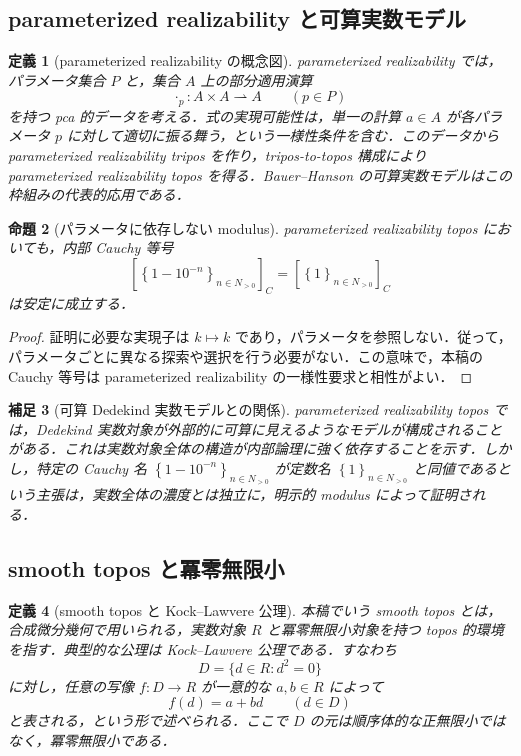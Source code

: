 \documentclass[a4paper,11pt]{ltjsarticle}
\theoremstyle{jpdef}
\newtheorem{definition}{定義}[section]
\newtheorem{remark}[definition]{補足}
\theoremstyle{jpthm}
\newtheorem{proposition}[definition]{命題}
\newcommand{\seq}[2]{\left\{#1\right\}_{#2}}
\begin{document}
\subsection{parameterized realizability と可算実数モデル}

\begin{definition}[parameterized realizability の概念図]
parameterized realizability では，パラメータ集合 \(P\) と，集合 \(A\) 上の部分適用演算
\[
  \cdot_p:A\times A\rightharpoonup A\qquad(p\in P)
\]
を持つ pca 的データを考える．式の実現可能性は，単一の計算 \(a\in A\) が各パラメータ \(p\) に対して適切に振る舞う，という一様性条件を含む．このデータから parameterized realizability tripos を作り，tripos-to-topos 構成により parameterized realizability topos を得る．Bauer--Hanson の可算実数モデルはこの枠組みの代表的応用である．
\end{definition}

\begin{proposition}[パラメータに依存しない modulus]
parameterized realizability topos においても，内部 Cauchy 等号
\[
  [\seq{1-10^{-n}}{n\in N_{>0}}]_C=[\seq{1}{n\in N_{>0}}]_C
\]
は安定に成立する．
\end{proposition}

\begin{proof}
証明に必要な実現子は \(k\mapsto k\) であり，パラメータを参照しない．従って，パラメータごとに異なる探索や選択を行う必要がない．この意味で，本稿の Cauchy 等号は parameterized realizability の一様性要求と相性がよい．
\end{proof}

\begin{remark}[可算 Dedekind 実数モデルとの関係]
parameterized realizability topos では，Dedekind 実数対象が外部的に可算に見えるようなモデルが構成されることがある．これは実数対象全体の構造が内部論理に強く依存することを示す．しかし，特定の Cauchy 名 \(\seq{1-10^{-n}}{n\in N_{>0}}\) が定数名 \(\seq{1}{n\in N_{>0}}\) と同値であるという主張は，実数全体の濃度とは独立に，明示的 modulus によって証明される．
\end{remark}

\subsection{smooth topos と冪零無限小}

\begin{definition}[smooth topos と Kock--Lawvere 公理]
本稿でいう smooth topos とは，合成微分幾何で用いられる，実数対象 \(R\) と冪零無限小対象を持つ topos 的環境を指す．典型的な公理は Kock--Lawvere 公理である．すなわち
\[
  D=\{d\in R:d^2=0\}
\]
に対し，任意の写像 \(f:D\to R\) が一意的な \(a,b\in R\) によって
\[
  f(d)=a+bd\qquad(d\in D)
\]
と表される，という形で述べられる．ここで \(D\) の元は順序体的な正無限小ではなく，冪零無限小である．
\end{definition}
\end{document}
